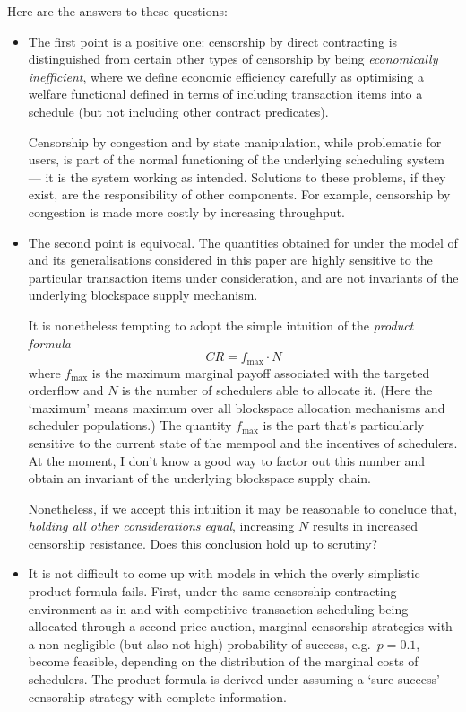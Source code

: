 Here are the answers to these questions:
\begin{itemize}
  \item
    The first point is a positive one: censorship by direct contracting is distinguished from certain other types of censorship by being \emph{economically inefficient}, where we define economic efficiency carefully as optimising a welfare functional defined in terms of including transaction items into a schedule (but not including other contract predicates).

    Censorship by congestion and by state manipulation, while problematic for users, is part of the normal functioning of the underlying scheduling system --- it is the system working as intended.
    Solutions to these problems, if they exist, are the responsibility of other components.
    For example, censorship by congestion is made more costly by increasing throughput.

  \item
    The second point is equivocal.
    The quantities obtained for under the model of \cite{FPR} and its generalisations considered in this paper are highly sensitive to the particular transaction items under consideration, and are not invariants of the underlying blockspace supply mechanism.
    
    It is nonetheless tempting to adopt the simple intuition of the \emph{product formula}
    \[
      CR = f_\mathrm{max} \cdot N
    \]
    where $f_\mathrm{max}$ is the maximum marginal payoff associated with the targeted orderflow and $N$ is the number of schedulers able to allocate it.
    (Here the `maximum' means maximum over all blockspace allocation mechanisms and scheduler populations.)
    The quantity $f_\mathrm{max}$ is the part that's particularly sensitive to the current state of the mempool and the incentives of schedulers.
    At the moment, I don't know a good way to factor out this number and obtain an invariant of the underlying blockspace supply chain.

    Nonetheless, if we accept this intuition it may be reasonable to conclude that, \emph{holding all other considerations equal}, increasing $N$ results in increased censorship resistance.
    Does this conclusion hold up to scrutiny?

  \item
    It is not difficult to come up with models in which the overly simplistic product formula fails.
    First, under the same censorship contracting environment as in \cite{FPR} and with competitive transaction scheduling being allocated through a second price auction, marginal censorship strategies with a non-negligible (but also not high) probability of success, e.g.~$p=0.1$, become feasible, depending on the distribution of the marginal costs of schedulers.
    The product formula is derived under assuming a `sure success' censorship strategy with complete information. 
    

\end{itemize}
